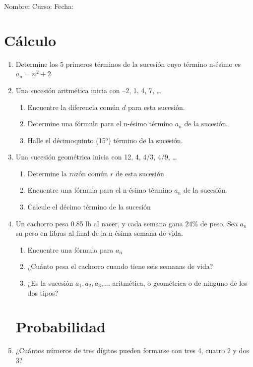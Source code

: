 \documentclass[fleqn]{article}
\newcommand{\LineaNombre}{%
\par
\vspace{\baselineskip}
Nombre:\hrulefill \; Curso: \underline{\hspace*{48pt}} \; Fecha: \underline{\hspace*{2.5cm}} \relax
\par}
\begin{document}
\LineaNombre
\section*{Cálculo}
\begin{enumerate}
 \item Determine los 5 primeros términos de la sucesión cuyo término n-ésimo es $a_{n}=n^{2}+2$
 \begin{enumerate}
 \end{enumerate}
 \item Una sucesión aritmética inicia con --2, 1, 4, 7, \ldots
 \begin{enumerate}
 \item Encuentre la diferencia común $d$ para esta sucesión.\noanswer
\item Determine una fórmula para el n-ésimo término $a_{n}$ de la sucesión.\noanswer
\item Halle el décimoquinto (15$^{o}$) término de la sucesión.\noanswer
 \end{enumerate}
 \item Una sucesión geométrica inicia con 12, 4, 4/3, 4/9, \ldots
 \begin{enumerate}
\item Determine la razón común $r$ de esta sucesión \noanswer
 \newpage
\item Encuentre una fórmula para el n-ésimo término $a_{n}$ de la sucesión.\noanswer
\item Calcule el décimo término de la sucesión\noanswer
\end{enumerate}
\item Un cachorro pesa 0.85 lb al nacer, y cada semana gana 24\% de peso. Sea $a_{n}$ su peso en libras al final de la n-ésima semana de vida.
\begin{enumerate}
\item Encuentre una fórmula para $a_{n}$\noanswer
\item ¿Cuánto pesa el cachorro cuando tiene seis semanas de vida?\noanswer
\item ¿Es la sucesión $a_{1},a_{2},a_{3},\ldots$ aritmética, o geométrica o de ninguno de los dos tipos? \noanswer
\end{enumerate}
\section*{Probabilidad}
\item ¿Cuántos números de tres dígitos pueden formarse con tres 4, cuatro 2 y dos 3?\noanswer
 \end{enumerate}
\end{document}
